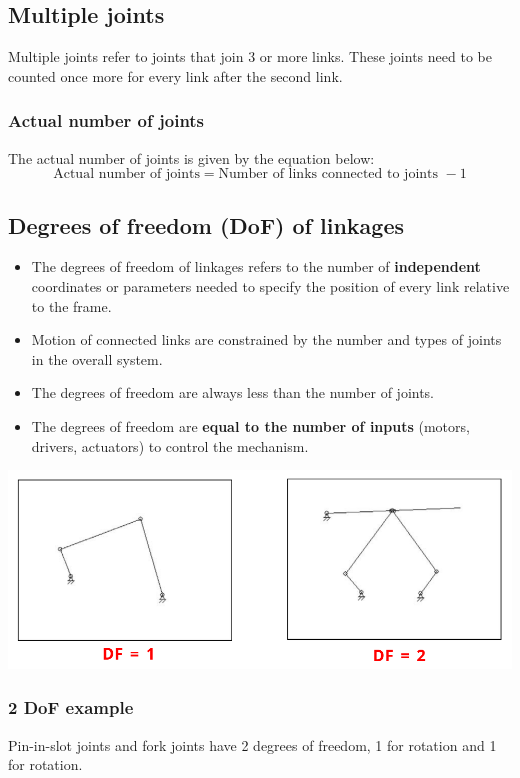 \documentclass[11pt]{article}
\begin{document}
\subsection{Multiple joints}
\label{sec:orge5d1d49}
Multiple joints refer to joints that join 3 or more links. These joints need to be counted once more for every link after the second link.
\subsubsection{Actual number of joints}
\label{sec:org380a71a}
The actual number of joints is given by the equation below:
\[\text{Actual number of joints} = \text{Number of links connected to joints } - 1\]
\subsection{Degrees of freedom (DoF) of linkages}
\label{sec:org31ffd56}
\begin{itemize}
\item The degrees of freedom of linkages refers to the number of \textbf{independent} coordinates or parameters needed to specify the position of every link relative to the frame.
\item Motion of connected links are constrained by the number and types of joints in the overall system.
\item The degrees of freedom are always less than the number of joints.
\item The degrees of freedom are \textbf{equal to the number of inputs} (motors, drivers, actuators) to control the mechanism.
\end{itemize}

\begin{center}
\includegraphics[width=.9\linewidth]{./images/degrees-of-freedom-diagram.png}
\end{center}

 \newpage
\subsubsection{2 DoF example}
\label{sec:org8ad6f51}
Pin-in-slot joints and fork joints have 2 degrees of freedom, 1 for rotation and 1 for rotation.
\end{document}

